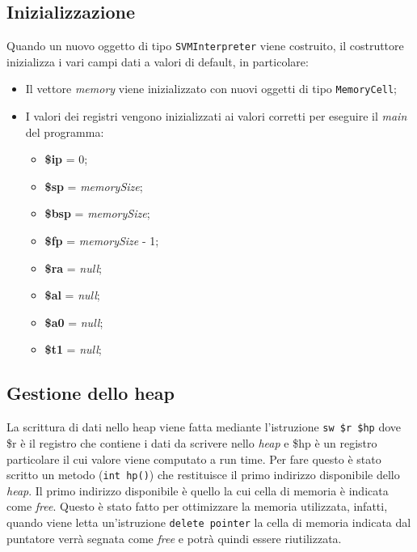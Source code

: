 \documentclass[../report.tex]{subfiles}
\begin{document}
\subsection{Inizializzazione}
Quando un nuovo oggetto di tipo \verb|SVMInterpreter| viene costruito, il costruttore inizializza i vari campi dati a valori di default, in particolare:
\begin{itemize}
    \item Il vettore \textit{memory} viene inizializzato con nuovi oggetti di tipo \verb|MemoryCell|;
    \item I valori dei registri vengono inizializzati ai valori corretti per eseguire il \textit{main} del programma:
        \begin{itemize}
            \item \textbf{\$ip} = 0;
            \item \textbf{\$sp} = \textit{memorySize};
            \item \textbf{\$bsp} = \textit{memorySize};
            \item \textbf{\$fp} = \textit{memorySize} - 1;
            \item \textbf{\$ra} = \textit{null};
            \item \textbf{\$al} = \textit{null};
            \item \textbf{\$a0} = \textit{null};
            \item \textbf{\$t1} = \textit{null};
        \end{itemize}
\end{itemize}

\subsection{Gestione dello heap}
La scrittura di dati nello heap viene fatta mediante l'istruzione \verb|sw $r $hp| dove \$r \`e il registro che contiene i dati da scrivere nello \textit{heap} e \$hp \`e un registro particolare il cui valore viene computato a run time. Per fare questo \`e stato scritto un metodo (\verb|int hp()|) che restituisce il primo indirizzo disponibile dello \textit{heap}. Il primo indirizzo disponibile \`e quello la cui cella di memoria \`e indicata come \textit{free}. Questo \`e stato fatto per ottimizzare la memoria utilizzata, infatti, quando viene letta un'istruzione \verb|delete pointer| la cella di memoria indicata dal puntatore verr\`a segnata come \textit{free} e potr\`a quindi essere riutilizzata.
\end{document}
